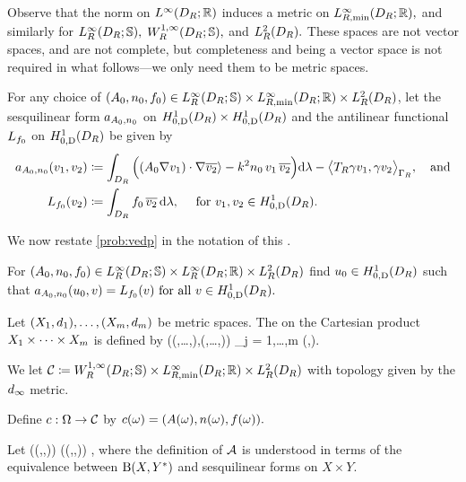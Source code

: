 Observe that the norm on $\LiDRRR$ induces a metric on $\LiRminDRRR,$ and similarly for $\LiRDRRRdtd,$ $\WoiRminDRRRdtd,$ and $\LtRDR.$ These spaces are not vector spaces, and are not complete, but completeness and being a vector space is not required in what follows---we only need them to be metric spaces.



For any choice of $\mleft(\Az,\nz,\fz\mright) \in \LiRDRRRdtd \times \LiRminDRRR \times \LtRDR$, let the sesquilinear form $a_{A_{0},n_{0}}$ on $\HozDDR \times \HozDDR$  and the antilinear functional $L_{f_{0}}$ on $\HozDDR$ be given by
\begin{align*}
\aGm\mleft(\vo,\vt\mright) &\de \int_{D_R} \Big(\mleft(\Az \grad \vo\mright)\cdot \grad \vtb \rangle 
 - k^2 \nz\, \vo\,\vtb \Big)\dd\Leb- \big\langle T_R \gamma \vo,\gamma \vt\big\rangle_{\Gamma_R}, \quad\text{and}\\
 \Lh(\vt) &\de \int_{D_R} \fz\, \vtb\,\dd\Leb, \quad\text{ for } \vo, \vt \in \HozDDR.
\end{align*}
\ede

We now restate \cref{prob:vedp} in the notation of this .

\label{prob:edpstoch}
For $\mleft(\Az,\nz,\fz\mright) \in \LiRDRRRdtd \times \LiRDRRR \times \LtRDR$ find 
$\uz \in \HozDDR$ such that $\aGm(\uz,v) = \Lh(v) \tforall v \in \HozDDR.$
\eprob

\label{def:dinfty}
Let $\mleft(\Xo,\done\mright),\ldots,\mleft(\Xm,\dm\mright)$ be metric spaces. The  on the Cartesian product $X_{1}\times\cdots\times X_{m}$ is defined by
\beqs
\dinfty\mleft(\mleft(\xo,\ldots,\xm\mright),\mleft(\yo,\ldots,\ym\mright)\mright) \de \max_{j = 1,\ldots,m} \dmetj\mleft(\xj,\yj\mright).
\eeqs
\ede


\label{def:cCHh}
We let
$\cC \de \WoiRminDRRRdtd \times \LiRminDRRR \times \LtRDR$
with topology given by the $d_{\infty}$ metric.
\ede


\label{def:inputmap}
Define $c:\Omega\rightarrow\mathcal C$ by
$\coeff(\omega) = \mleft(A(\omega),n(\omega),f(\omega)\mright).$
\ede

Let
\beq\label{eq:hhform}
\toform\mleft(\mleft(\Az,\nz,\fz\mright)\mright) \de \aGm \quad {} \quad \rhs\mleft(\mleft(\Az,\nz,\fz\mright)\mright) \de \Lh,
\eeq
where the definition of $\mathcal A$ is understood in terms of the equivalence between $\homspace$ and sesquilinear forms on $X \times Y.$
\ede

